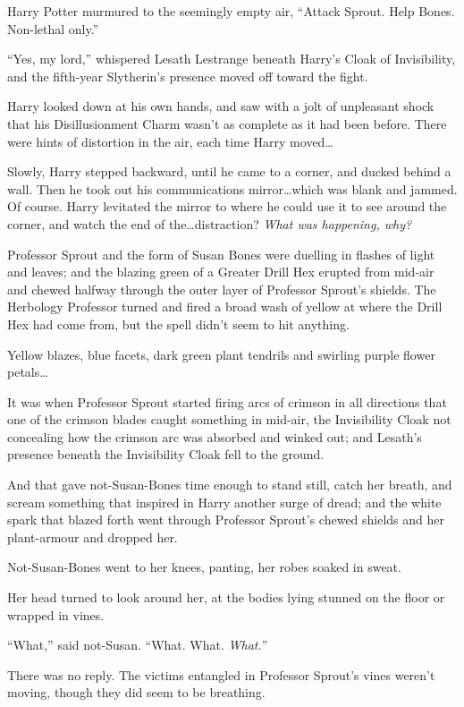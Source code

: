 Harry Potter murmured to the seemingly empty air,
“Attack Sprout. Help Bones. Non-lethal only.”

“Yes, my lord,” whispered Lesath Lestrange beneath Harry’s Cloak of Invisibility, and the fifth-year Slytherin’s presence moved off toward the fight.

Harry looked down at his own hands, and saw with a jolt of unpleasant shock that his Disillusionment Charm wasn’t as complete as it had been before. There were hints of distortion in the air, each time Harry moved…

Slowly, Harry stepped backward, until he came to a corner, and ducked behind a wall. Then he took out his communications mirror…which was blank and jammed. Of course. Harry levitated the mirror to where he could use it to see around the corner, and watch the end of the…distraction? \emph{What was happening, why?}

Professor Sprout and the form of Susan Bones were duelling in flashes of light and leaves; and the blazing green of a Greater Drill Hex erupted from mid-air and chewed halfway through the outer layer of Professor Sprout’s shields. The Herbology Professor turned and fired a broad wash of yellow at where the Drill Hex had come from, but the spell didn’t seem to hit anything.

Yellow blazes, blue facets, dark green plant tendrils and swirling purple flower petals…

It was when Professor Sprout started firing arcs of crimson in all directions that one of the crimson blades caught something in mid-air, the Invisibility Cloak not concealing how the crimson arc was absorbed and winked out; and Lesath’s presence beneath the Invisibility Cloak fell to the ground.

And that gave not-Susan-Bones time enough to stand still, catch her breath, and scream something that inspired in Harry another surge of dread; and the white spark that blazed forth went through Professor Sprout’s chewed shields and her plant-armour and dropped her.

Not-Susan-Bones went to her knees, panting, her robes soaked in sweat.

Her head turned to look around her, at the bodies lying stunned on the floor or wrapped in vines.

“What,” said not-Susan.
“What. What. \emph{What.}”

There was no reply. The victims entangled in Professor Sprout’s vines weren’t moving, though they did seem to be breathing.

